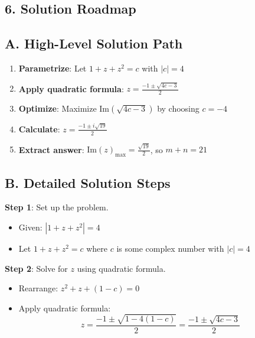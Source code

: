 \documentclass[11pt]{article}
\begin{document}
\begin{roadmapbox}
\section*{6. Solution Roadmap}

\subsection*{A. High-Level Solution Path}
\begin{enumerate}[leftmargin=*]
    \item \textbf{Parametrize}: Let $1+z+z^2 = c$ with $|c| = 4$
    \item \textbf{Apply quadratic formula}: $z = \frac{-1 \pm \sqrt{4c-3}}{2}$
    \item \textbf{Optimize}: Maximize $\text{Im}(\sqrt{4c-3})$ by choosing $c = -4$
    \item \textbf{Calculate}: $z = \frac{-1 \pm i\sqrt{19}}{2}$
    \item \textbf{Extract answer}: $\text{Im}(z)_{\max} = \frac{\sqrt{19}}{2}$, so $m+n = 21$
\end{enumerate}

\subsection*{B. Detailed Solution Steps}

\textbf{Step 1}: Set up the problem.
\begin{itemize}
    \item Given: $|1+z+z^2| = 4$
    \item Let $1+z+z^2 = c$ where $c$ is some complex number with $|c| = 4$
\end{itemize}

\textbf{Step 2}: Solve for $z$ using quadratic formula.
\begin{itemize}
    \item Rearrange: $z^2 + z + (1-c) = 0$
    \item Apply quadratic formula:
    \[z = \frac{-1 \pm \sqrt{1-4(1-c)}}{2} = \frac{-1 \pm \sqrt{4c-3}}{2}\]
\end{itemize}


\end{roadmapbox}
\end{document}
